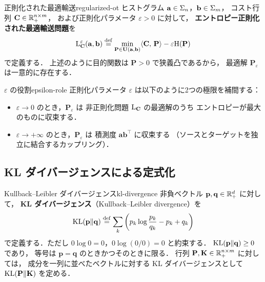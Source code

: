 \begin{setting}{正則化された最適輸送}{regularized-ot}
  ヒストグラム $\mathbf{a} \in \Sigma_n$，$\mathbf{b} \in \Sigma_m$，
  コスト行列 $\mathbf{C} \in \mathbb{R}_+^{n \times m}$，
  および正則化パラメータ $\varepsilon > 0$ に対して，
  \textbf{エントロピー正則化された最適輸送問題}を
  \[
    \mathrm{L}_{\mathbf{C}}^\varepsilon(\mathbf{a}, \mathbf{b})
    \overset{\mathrm{def}}{=}
    \min_{\mathbf{P} \in \mathbf{U}(\mathbf{a}, \mathbf{b})}
    \langle \mathbf{C},\, \mathbf{P} \rangle - \varepsilon \mathrm{H}(\mathbf{P})
  \]
  で定義する．
  上述のように目的関数は $\mathbf{P} > 0$ で狭義凸であるから，
  最適解 $\mathbf{P}_\varepsilon$ は一意的に存在する．
\end{setting}

\begin{remark}{$\varepsilon$ の役割}{epsilon-role}
  正則化パラメータ $\varepsilon$ は以下のように2つの極限を補間する：
  \begin{itemize}
    \item $\varepsilon \to 0$ のとき，$\mathbf{P}_\varepsilon$ は
      非正則化問題 $\mathrm{L}_{\mathbf{C}}$ の最適解のうち
      エントロピーが最大のものに収束する．
    \item $\varepsilon \to +\infty$ のとき，$\mathbf{P}_\varepsilon$ は
      積測度 $\mathbf{a} \mathbf{b}^\top$ に収束する
      （ソースとターゲットを独立に結合するカップリング）．
  \end{itemize}
\end{remark}

\subsection{KL ダイバージェンスによる定式化}
\label{sec:kl-formulation}

\begin{definition}{Kullback--Leibler ダイバージェンス}{kl-divergence}
  非負ベクトル $\mathbf{p}, \mathbf{q} \in \mathbb{R}_+^{d}$ に対して，
  \textbf{KL ダイバージェンス}（Kullback--Leibler divergence）を
  \[
    \mathrm{KL}(\mathbf{p} \| \mathbf{q})
    \overset{\mathrm{def}}{=} \sum_{k} \left(
    p_{k} \log \frac{p_{k}}{q_{k}} - p_{k} + q_{k}
    \right)
  \]
  で定義する．ただし $0 \log 0 = 0$，$0 \log(0/0) = 0$ と約束する．
  $\mathrm{KL}(\mathbf{p} \| \mathbf{q}) \geq 0$ であり，
  等号は $\mathbf{p} = \mathbf{q}$ のときかつそのときに限る．
  行列 $\mathbf{P}, \mathbf{K} \in \mathbb{R}_+^{n \times m}$ に対しては，
  成分を一列に並べたベクトルに対する KL ダイバージェンスとして
  $\mathrm{KL}(\mathbf{P} \| \mathbf{K})$ を定める．
\end{definition}

